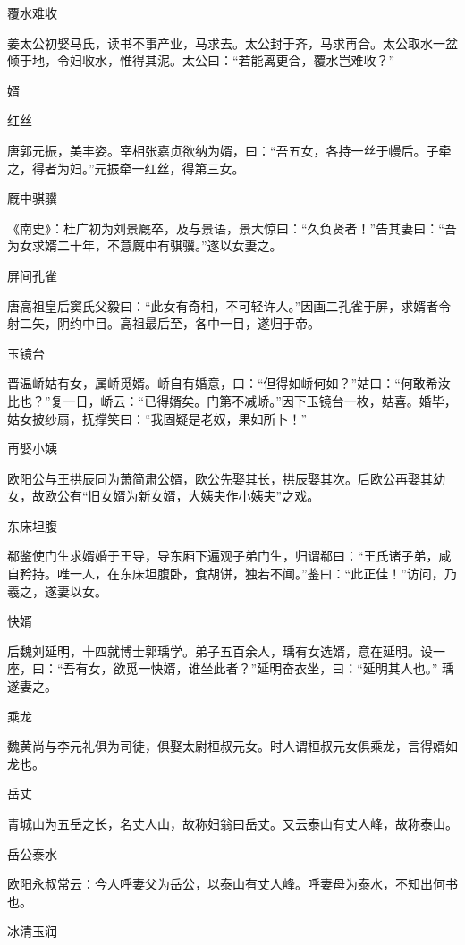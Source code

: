 \documentclass[a4paper,12pt,UTF8,twoside]{ctexbook}
\begin{document}
    覆水难收
    
    姜太公初娶马氏，读书不事产业，马求去。太公封于齐，马求再合。太公取水一盆倾于地，令妇收水，惟得其泥。太公曰：“若能离更合，覆水岂难收？”
    
    婿
    
    红丝
    
    唐郭元振，美丰姿。宰相张嘉贞欲纳为婿，曰：“吾五女，各持一丝于幔后。子牵之，得者为妇。”元振牵一红丝，得第三女。
    
    厩中骐骥
    
    《南史》：杜广初为刘景厩卒，及与景语，景大惊曰：“久负贤者！”告其妻曰：“吾为女求婿二十年，不意厩中有骐骥。”遂以女妻之。
    
    屏间孔雀
    
    唐高祖皇后窦氏父毅曰：“此女有奇相，不可轻许人。”因画二孔雀于屏，求婿者令射二矢，阴约中目。高祖最后至，各中一目，遂归于帝。
    
    玉镜台
    
    晋温峤姑有女，属峤觅婿。峤自有婚意，曰：“但得如峤何如？”姑曰：“何敢希汝比也？”复一日，峤云：“已得婿矣。门第不减峤。”因下玉镜台一枚，姑喜。婚毕，姑女披纱扇，抚撑笑曰：“我固疑是老奴，果如所卜！”
    
    再娶小姨
    
    欧阳公与王拱辰同为萧简肃公婿，欧公先娶其长，拱辰娶其次。后欧公再娶其幼女，故欧公有“旧女婿为新女婿，大姨夫作小姨夫”之戏。
    
    东床坦腹
    
    郗鉴使门生求婿婚于王导，导东厢下遍观子弟门生，归谓郗曰：“王氏诸子弟，咸自矜持。唯一人，在东床坦腹卧，食胡饼，独若不闻。”鉴曰：“此正佳！”访问，乃羲之，遂妻以女。
    
    快婿
    
    后魏刘延明，十四就博士郭瑀学。弟子五百余人，瑀有女选婿，意在延明。设一座，曰：“吾有女，欲觅一快婿，谁坐此者？”延明奋衣坐，曰：“延明其人也。” 瑀遂妻之。
    
    乘龙
    
    魏黄尚与李元礼俱为司徒，俱娶太尉桓叔元女。时人谓桓叔元女俱乘龙，言得婿如龙也。
    
    岳丈
    
    青城山为五岳之长，名丈人山，故称妇翁曰岳丈。又云泰山有丈人峰，故称泰山。
    
    岳公泰水
    
    欧阳永叔常云：今人呼妻父为岳公，以泰山有丈人峰。呼妻母为泰水，不知出何书也。
    
    冰清玉润
    
\end{document}
